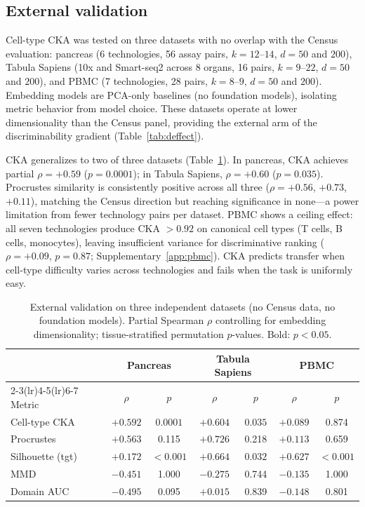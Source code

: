 \documentclass[11pt]{article}
\begin{document}
\subsection{External validation}
\label{sec:external}

Cell-type CKA was tested on three datasets with no overlap with the
Census evaluation: pancreas \citep{luecken2022scib} (6 technologies, 56
assay pairs, $k = 12$--$14$, $d = 50$ and $200$), Tabula Sapiens
\citep{tabulasapiens2022} (10x and Smart-seq2 across 8 organs, 16
pairs, $k = 9$--$22$, $d = 50$ and $200$), and PBMC
\citep{ding2020systematic} (7 technologies, 28 pairs, $k = 8$--$9$,
$d = 50$ and $200$). Embedding models are PCA-only baselines (no
foundation models), isolating metric behavior from model choice. These
datasets operate at lower dimensionality than the Census panel,
providing the external arm of the discriminability gradient
(Table~\ref{tab:deffect}).

CKA generalizes to two of three datasets
(Table~\ref{tab:external}). In pancreas, CKA achieves partial
$\rho = +0.59$ ($p = 0.0001$); in Tabula Sapiens, $\rho = +0.60$
($p = 0.035$). Procrustes similarity is consistently positive across all
three ($\rho = +0.56$, $+0.73$, $+0.11$), matching the Census direction
but reaching significance in none---a power limitation from fewer
technology pairs per dataset. PBMC shows a ceiling effect: all seven
technologies produce CKA $> 0.92$ on canonical cell types (T cells, B
cells, monocytes), leaving insufficient variance for discriminative
ranking ($\rho = +0.09$, $p = 0.87$; Supplementary~\ref{app:pbmc}). CKA
predicts transfer when cell-type difficulty varies across technologies
and fails when the task is uniformly easy.

\begin{table}[t]
\centering
\caption{External validation on three independent datasets (no Census
data, no foundation models). Partial Spearman $\rho$ controlling for
embedding dimensionality; tissue-stratified permutation $p$-values.
Bold: $p < 0.05$.}
\label{tab:external}
\small
\begin{tabular}{@{}lcccccc@{}}
\toprule
& \multicolumn{2}{c}{Pancreas} & \multicolumn{2}{c}{Tabula Sapiens} & \multicolumn{2}{c}{PBMC} \\
\cmidrule(lr){2-3}\cmidrule(lr){4-5}\cmidrule(lr){6-7}
Metric & $\rho$ & $p$ & $\rho$ & $p$ & $\rho$ & $p$ \\
\midrule
Cell-type CKA & $+0.592$ & $\mathbf{0.0001}$ & $+0.604$ & $\mathbf{0.035}$ & $+0.089$ & 0.874 \\
Procrustes    & $+0.563$ & 0.115              & $+0.726$ & 0.218             & $+0.113$ & 0.659 \\
\midrule
Silhouette (tgt) & $+0.172$ & $\mathbf{<0.001}$ & $+0.664$ & $\mathbf{0.032}$ & $+0.627$ & $\mathbf{<0.001}$ \\
MMD              & $-0.451$ & 1.000              & $-0.275$ & 0.744             & $-0.135$ & 1.000 \\
Domain AUC       & $-0.495$ & 0.095              & $+0.015$ & 0.839             & $-0.148$ & 0.801 \\
\bottomrule
\end{tabular}
\end{table}
\end{document}
